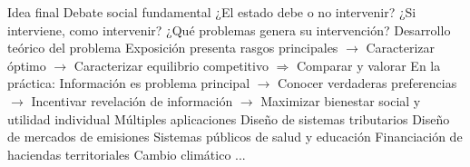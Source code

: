 \documentclass{nuevotema}
\begin{document}
\begin{esquemal}
		\2 Idea final
			\3 Debate social fundamental
				\4 ¿El estado debe o no intervenir?
				\4 ¿Si interviene, como intervenir?
				\4 ¿Qué problemas genera su intervención?
			\3 Desarrollo teórico del problema
				\4 Exposición presenta rasgos principales
				\4[] $\to$ Caracterizar óptimo
				\4[] $\to$ Caracterizar equilibrio competitivo
				\4[] $\Rightarrow$ Comparar y valorar
				\4 En la práctica:
				\4[] Información es problema principal
				\4[] $\to$ Conocer verdaderas preferencias
				\4[] $\to$ Incentivar revelación de información
				\4[] $\to$ Maximizar bienestar social y utilidad individual
			\3 Múltiples aplicaciones
				\4 Diseño de sistemas tributarios
				\4 Diseño de mercados de emisiones
				\4 Sistemas públicos de salud y educación
				\4 Financiación de haciendas territoriales
				\4 Cambio climático
				\4 ...
\end{esquemal}

























\graficas
\end{document}

